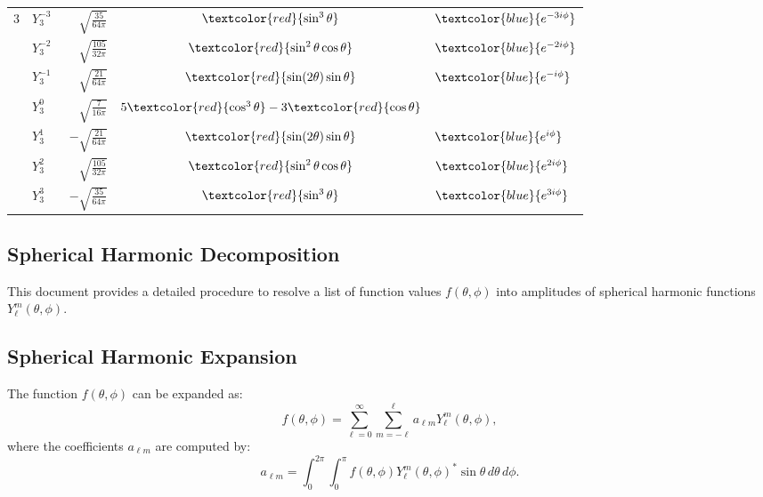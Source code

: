 \begin{table}[h!]
\begin{tabular}{clrcl}
        3 & \( Y_3^{-3} \) & \( \sqrt{\frac{35}{64\pi}} \) & \( \textcolor{red}{\sin^3\theta} \) & \( \textcolor{blue}{e^{-3i\phi}} \) \\[3pt]
          & \( Y_3^{-2} \) & \( \sqrt{\frac{105}{32\pi}} \) & \( \textcolor{red}{\sin^2\theta \cos\theta} \) & \( \textcolor{blue}{e^{-2i\phi}} \) \\[3pt]
          & \( Y_3^{-1} \) & \( \sqrt{\frac{21}{64\pi}} \) & \( \textcolor{red}{\sin(2\theta) \sin\theta} \) & \( \textcolor{blue}{e^{-i\phi}} \) \\[3pt]
          & \( Y_3^0 \) & \( \phantom{-} \sqrt{\frac{7}{16\pi}} \) & \( 5\textcolor{red}{\cos^3\theta} - 3\textcolor{red}{\cos\theta} \) & \\[3pt]
          & \( Y_3^1 \) & \( -\sqrt{\frac{21}{64\pi}} \) & \( \textcolor{red}{\sin(2\theta) \sin\theta} \) & \( \textcolor{blue}{e^{i\phi}} \) \\[3pt]
          & \( Y_3^2 \) & \( \sqrt{\frac{105}{32\pi}} \) & \( \textcolor{red}{\sin^2\theta \cos\theta} \) & \( \textcolor{blue}{e^{2i\phi}} \) \\[3pt]
          & \( Y_3^3 \) & \( -\sqrt{\frac{35}{64\pi}} \) & \( \textcolor{red}{\sin^3\theta} \) & \( \textcolor{blue}{e^{3i\phi}} \) \\[5pt]

    \end{tabular}
\end{table}

\subsection{Spherical Harmonic Decomposition}

This document provides a detailed procedure to resolve a list of function values \( f(\theta, \phi) \) into amplitudes of spherical harmonic functions \( Y_\ell^m(\theta, \phi) \).

\subsection{Spherical Harmonic Expansion}
The function \( f(\theta, \phi) \) can be expanded as:
\[
f(\theta, \phi) = \sum_{\ell=0}^\infty \sum_{m=-\ell}^\ell a_{\ell m} Y_\ell^m(\theta, \phi),
\]
where the coefficients \( a_{\ell m} \) are computed by:
\[
a_{\ell m} = \int_{0}^{2\pi} \int_{0}^{\pi} f(\theta, \phi) Y_\ell^m(\theta, \phi)^* \sin\theta \, d\theta \, d\phi.
\]

